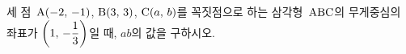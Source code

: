 세 점~$\mathrm{A}(-2,\mkern3mu -1)$, $\mathrm{B}(3,\mkern3mu 3)$, $\mathrm{C}(a,\mkern3mu b)$를 꼭짓점으로 하는 삼각형~$\mathrm{ABC}$의 무게중심의 좌표가 $\left(1,\mkern3mu -\dfrac{1}{3}\right)$일 때, $ab$의 값을 구하시오.
